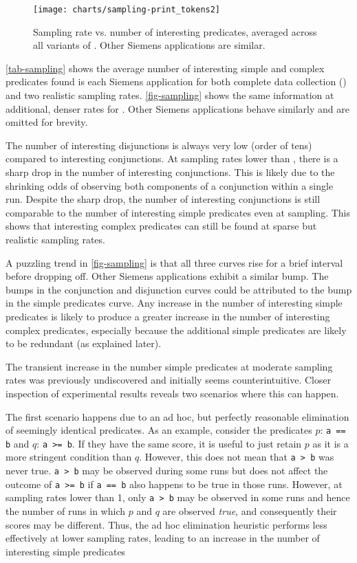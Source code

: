 \begin{figure}[tb]
  \centering
  \texttt{[image: charts/sampling-print\_tokens2]}
  \caption{Sampling rate vs. number of interesting predicates,
    averaged across all variants of .  Other
    Siemens applications are similar.}
  \label{fig-sampling}
\end{figure}

\autoref{tab-sampling} shows the average number of interesting simple
and complex predicates found is each Siemens application for both
complete data collection () and two realistic sampling
rates.  \autoref{fig-sampling} shows the same information at
additional, denser rates for .  Other Siemens
applications behave similarly and are omitted for brevity.

The number of interesting disjunctions is always very low (order of
tens) compared to interesting conjunctions.  At sampling rates lower
than , there is a sharp drop in the number of
interesting conjunctions.  This is likely due to the shrinking odds of
observing both components of a conjunction within a single run.
Despite the sharp drop, the number of interesting conjunctions is
still comparable to the number of interesting simple predicates even
at  sampling.  This shows that interesting complex
predicates can still be found at sparse but realistic sampling rates.

A puzzling trend in \autoref{fig-sampling} is that all three curves
rise for a brief interval before dropping off.  Other Siemens
applications exhibit a similar bump.  The bumps in the conjunction and
disjunction curves could be attributed to the bump in the simple
predicates curve.  Any increase in the number of interesting simple
predicates is likely to produce a greater increase in the number of
interesting complex predicates, especially because the additional
simple predicates are likely to be redundant (as explained later).

The transient increase in the number simple predicates at moderate
sampling rates was previously undiscovered and initially seems
counterintuitive.  Closer inspection of experimental results reveals
two scenarios where this can happen.

The first scenario happens due to an ad hoc, but perfectly reasonable
elimination of seemingly identical predicates.  As an example, consider the
predicates $p$: \texttt{a == b} and $q$: \texttt{a >= b}.  If they have the
same score, it is useful to just retain $p$ as it is a more stringent
condition than $q$.  However, this does not mean
that \texttt{a > b} was never true.  \texttt{a > b} may be observed  during 
some runs but does not affect the outcome of \texttt{a >= b} if \texttt{a == b}
also happens to be true in those runs.  However, at sampling rates lower than
1, only \texttt{a > b} may be observed in some runs and hence the number of
runs in which $p$ and $q$ are observed \emph{true}, and consequently their
scores may be different.  Thus, the ad hoc elimination heuristic performs 
less effectively at lower sampling rates, leading to an increase in the 
number of interesting simple predicates

